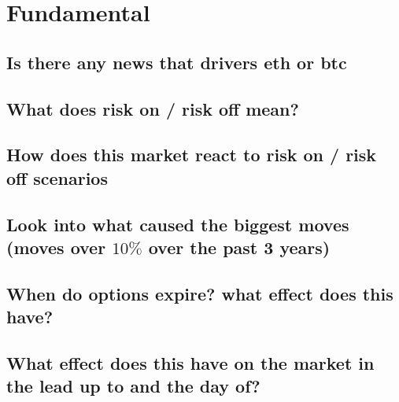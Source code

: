 \chapter{Fundamental}
\label{fun}

\section{ Is there any news that drivers eth or btc}
\section{ What does risk on / risk off mean?}
\section{ How does this market react to risk on / risk off scenarios}
\section{ Look into what caused the biggest moves (moves over $10 \%$  over the past 3 years)}
\section{ When do options expire? what effect does this have?}
\section{ What effect does this have on the market in the lead up to and the day of?}